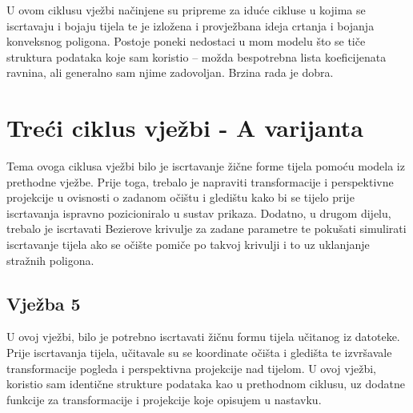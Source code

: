 \documentclass[utf8]{fer}
\begin{document}
U ovom ciklusu vježbi načinjene su pripreme za iduće cikluse u kojima se iscrtavaju i bojaju tijela te je izložena i provježbana ideja crtanja i bojanja konveksnog poligona. Postoje poneki nedostaci u mom modelu što se tiče struktura podataka koje sam koristio -- možda bespotrebna lista koeficijenata ravnina, ali generalno sam njime zadovoljan. Brzina rada je dobra. 


\chapter{Treći ciklus vježbi - A varijanta}
Tema ovoga ciklusa vježbi bilo je iscrtavanje žične forme tijela pomoću modela iz prethodne vježbe. Prije toga, trebalo je napraviti transformacije i perspektivne projekcije u ovisnosti o zadanom očištu i gledištu kako bi se tijelo prije iscrtavanja ispravno pozicioniralo u sustav prikaza. Dodatno, u drugom dijelu, trebalo je iscrtavati Bezierove krivulje za zadane parametre te pokušati simulirati iscrtavanje tijela ako se očište pomiče po takvoj krivulji i to uz uklanjanje stražnih poligona.

\section{Vježba 5}

U ovoj vježbi, bilo je potrebno iscrtavati žičnu formu tijela učitanog iz datoteke. Prije iscrtavanja tijela, učitavale su se koordinate očišta i gledišta te izvršavale transformacije pogleda i perspektivna projekcije nad tijelom. U ovoj vježbi, koristio sam identične strukture podataka kao u prethodnom ciklusu, uz dodatne funkcije za transformacije i projekcije koje opisujem u nastavku.
\end{document}
